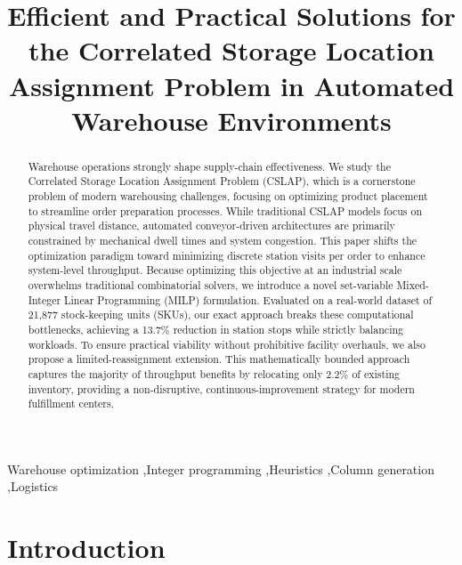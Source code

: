 \documentclass[preprint,review,11pt,authoryear]{elsarticle}
\begin{document}
\begin{frontmatter}

\title{Efficient and Practical Solutions for the Correlated Storage Location Assignment Problem in Automated Warehouse Environments}


\begin{abstract}
Warehouse operations strongly shape supply-chain effectiveness. We study the Correlated Storage Location Assignment Problem (CSLAP), which is a cornerstone problem of modern warehousing challenges, focusing on optimizing product placement to streamline order preparation processes. While traditional CSLAP models focus on physical travel distance, automated conveyor-driven architectures are primarily constrained by mechanical dwell times and system congestion. This paper shifts the optimization paradigm toward minimizing discrete station visits per order to enhance system-level throughput. Because optimizing this objective at an industrial scale overwhelms traditional combinatorial solvers, we introduce a novel set-variable Mixed-Integer Linear Programming (MILP) formulation. Evaluated on a real-world dataset of 21,877 stock-keeping units (SKUs), our exact approach breaks these computational bottlenecks, achieving a 13.7\% reduction in station stops while strictly balancing workloads. To ensure practical viability without prohibitive facility overhauls, we also propose a limited-reassignment extension. This mathematically bounded approach captures the majority of throughput benefits by relocating only 2.2\% of existing inventory, providing a non-disruptive, continuous-improvement strategy for modern fulfillment centers.
\end{abstract}

\begin{keyword}
Warehouse optimization \sep Integer programming \sep Heuristics \sep Column generation \sep Logistics
\end{keyword}

\end{frontmatter}
\clearpage

\section{Introduction}
\end{document}
